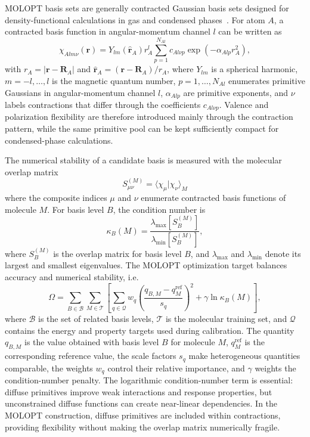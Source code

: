 \documentclass[aps,prb,reprint,amsmath,amssymb,superscriptaddress,longbibliography,floatfix]{revtex4-2}
\begin{document}
MOLOPT basis sets are generally contracted Gaussian basis sets designed for density-functional calculations in gas and condensed phases~\cite{VandeVondele2007}. For atom $A$, a contracted basis function in angular-momentum channel $l$ can be written as
\begin{equation}
\chi_{A l m \nu}(\mathbf r)
=
Y_{lm}(\hat{\mathbf r}_A) r_A^{l}
\sum_{p=1}^{N_{Al}} c_{A l\nu p}
\exp\left(-\alpha_{A l p} r_A^2\right),
\label{eq:contracted_basis}
\end{equation}
with $r_A=|\mathbf r-\mathbf R_A|$ and $\hat{\mathbf r}_A=(\mathbf r-\mathbf R_A)/r_A$, where $Y_{lm}$ is a spherical harmonic, $m=-l,\ldots,l$ is the magnetic quantum number, $p=1,\ldots,N_{Al}$ enumerates primitive Gaussians in angular-momentum channel $l$, $\alpha_{A l p}$ are primitive exponents, and $\nu$ labels contractions that differ through the coefficients $c_{A l\nu p}$. Valence and polarization flexibility are therefore introduced mainly through the contraction pattern, while the same primitive pool can be kept sufficiently compact for condensed-phase calculations.

The numerical stability of a candidate basis is measured with the molecular overlap matrix
\begin{equation}
S_{\mu\nu}^{(M)} =\langle \chi_\mu|\chi_\nu\rangle_M
\label{eq:overlap}
\end{equation}
where the composite indices $\mu$ and $\nu$ enumerate contracted basis functions of molecule $M$. For basis level $B$, the condition number is
\begin{equation}
\kappa_B(M)=
\frac{\lambda_{\max}\!\left[S_B^{(M)}\right]}
{\lambda_{\min}\!\left[S_B^{(M)}\right]} ,
\label{eq:condition}
\end{equation}
where $S_B^{(M)}$ is the overlap matrix for basis level $B$, and $\lambda_{\max}$ and $\lambda_{\min}$ denote its largest and smallest eigenvalues. The MOLOPT optimization target balances accuracy and numerical stability, i.e.
\begin{equation}
\Omega =
\sum_{B\in\mathcal B}\sum_{M\in\mathcal T}
\left[
\sum_{q\in\mathcal Q} w_q
\left(
\frac{q_{B,M}-q_M^{\mathrm{ref}}}{s_q}
\right)^2
+ \gamma\ln\kappa_B(M)
\right],
\label{eq:molopt}
\end{equation}
where $\mathcal B$ is the set of related basis levels, $\mathcal T$ is the molecular training set, and $\mathcal Q$ contains the energy and property targets used during calibration. The quantity $q_{B,M}$ is the value obtained with basis level $B$ for molecule $M$, $q_M^{\mathrm{ref}}$ is the corresponding reference value, the scale factors $s_q$ make heterogeneous quantities comparable, the weights $w_q$ control their relative importance, and $\gamma$ weights the condition-number penalty. The logarithmic condition-number term is essential: diffuse primitives improve weak interactions and response properties, but unconstrained diffuse functions can create near-linear dependencies. In the MOLOPT construction, diffuse primitives are included within contractions, providing flexibility without making the overlap matrix numerically fragile.
\end{document}

